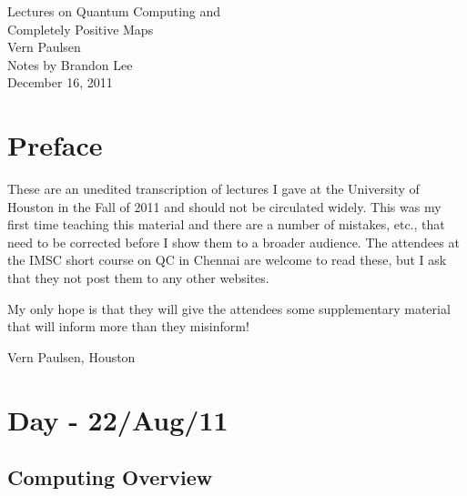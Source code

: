 \documentclass[12pt]{article}
\theoremstyle{definition}
\begin{document}
\begin{titlepage}
\begin{center}
\vspace*{3cm}
{\LARGE Lectures on Quantum Computing and}\\[0.5em]
{\LARGE Completely Positive Maps}\\[2em]
{\large Vern Paulsen}\\[0.5em]
{\large Notes by Brandon Lee}\\[0.5em]
{\large December 16, 2011}
\end{center}
\end{titlepage}

\tableofcontents
\newpage

\section{Preface}

These are an unedited transcription of lectures I gave at the University of Houston in the Fall of 2011 and should not be circulated widely. This was my first time teaching this material and there are a number of mistakes, etc., that need to be corrected before I show them to a broader audience. The attendees at the IMSC short course on QC in Chennai are welcome to read these, but I ask that they not post them to any other websites.

My only hope is that they will give the attendees some supplementary material that will inform more than they misinform!

Vern Paulsen, Houston

\section{Day - 22/Aug/11}

\subsection{Computing Overview}
\end{document}
